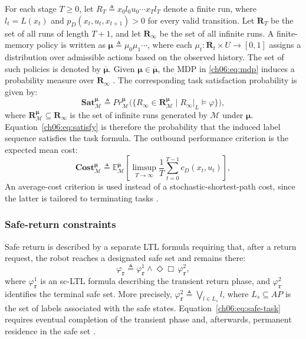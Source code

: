 For each stage $T \geq 0$, let
$R_T \triangleq x_0 l_0 u_0 \cdots x_T l_T$ denote a finite run, where
$l_t = L(x_t)$ and $p_D(x_t,u_t,x_{t+1}) > 0$ for every valid transition.
Let $\mathbf{R}_T$ be the set of all runs of length $T+1$, and let
$\mathbf{R}_{\infty}$ be the set of all infinite runs. A finite-memory policy
is written as $\boldsymbol{\mu} \triangleq \mu_0 \mu_1 \cdots$, where each
$\mu_t \colon \mathbf{R}_t \times U \rightarrow [0,1]$ assigns a distribution
over admissible actions based on the observed history. The set of such policies
is denoted by $\overline{\boldsymbol{\mu}}$.
Given $\boldsymbol{\mu} \in \overline{\boldsymbol{\mu}}$, the MDP in
\eqref{ch06:eq:mdp} induces a probability measure over
$\mathbf{R}_{\infty}$ \citep{baier2008principles}. The corresponding task
satisfaction probability is given by:
\begin{equation}
\label{ch06:eq:satisfy}
\textbf{Sat}_{\mathcal{M}}^{\boldsymbol{\mu}} \triangleq
Pr_{\mathcal{M}}^{\boldsymbol{\mu}}
\bigl(
\{R_{\infty} \in \mathbf{R}_{\mathcal{M}}^{\boldsymbol{\mu}} \mid
R_{\infty}|_{L} \models \varphi\}
\bigr),
\end{equation}
where $\mathbf{R}_{\mathcal{M}}^{\boldsymbol{\mu}} \subseteq
\mathbf{R}_{\infty}$ is the set of infinite runs generated by
$\mathcal{M}$ under $\boldsymbol{\mu}$. Equation~\eqref{ch06:eq:satisfy} is
therefore the probability that the induced label sequence satisfies the task
formula.
The outbound performance criterion is the expected mean cost:
\begin{equation}
\label{ch06:eq:total-cost}
\textbf{Cost}_{\mathcal{M}}^{\boldsymbol{\mu}} \triangleq
\mathbb{E}_{\mathcal{M}}^{\boldsymbol{\mu}}
\left[
\limsup_{T \rightarrow \infty}
\frac{1}{T} \sum_{t=0}^{T-1} c_D(x_t,u_t)
\right],
\end{equation}
 An average-cost
criterion is used instead of a stochastic-shortest-path cost, since the latter
is tailored to terminating tasks
\citep{puterman2014markov,bertsekas1995neuro,polychronopoulos1996stochastic}.

\subsubsection{Safe-return constraints}
\label{ch06:subsec:safety}

Safe return is described by a separate LTL formula requiring that, after a
return request, the robot reaches a designated safe set and remains there:
\begin{equation}
\label{ch06:eq:safe-task}
\varphi_{\texttt{r}} \triangleq
\varphi_{\texttt{r}}^{1} \wedge \Diamond \Box \,\varphi_{\texttt{r}}^{2},
\end{equation}
where $\varphi_{\texttt{r}}^{1}$ is an sc-LTL formula describing the transient
return phase, and $\varphi_{\texttt{r}}^{2}$ identifies the terminal safe set.
More precisely,
$\varphi_{\texttt{r}}^{2} \triangleq \bigvee_{l \in L_s} l$, where
$L_s \subseteq AP$ is the set of labels associated with the safe states.
Equation~\eqref{ch06:eq:safe-task} requires eventual completion of the transient
phase and, afterwards, permanent residence in the safe set
\citep{baier2008principles,pnueli1981temporal}.

